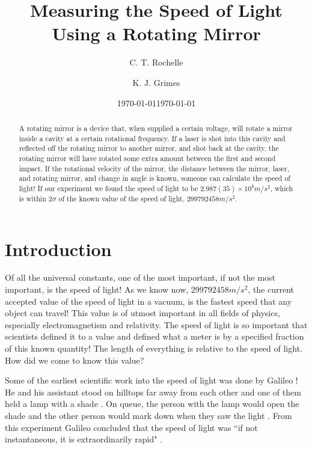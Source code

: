 \documentclass[aps,prl,10pt,twocolumn,floatfix]{revtex4-2}
\begin{document}
\begin{abstract}
A rotating mirror is a device that, when supplied a certain voltage, will rotate a mirror inside a cavity at a certain rotational frequency. 
If a laser is shot into this cavity and reflected off the rotating mirror to another mirror, and shot back at the cavity, the rotating mirror will have rotated some extra amount between the first and second impact.
If the rotational velocity of the mirror, the distance between the mirror, laser, and rotating mirror, and change in angle is known, someone can calculate the speed of light!
If our experiment we found the speed of light to be $2.987(35)\times 10^{8}m/s^2$, which is within $2\sigma$ of the known value of the speed of light, $299792458m/s^2$.
\end{abstract}


\title{Measuring the Speed of Light Using a Rotating Mirror}
\author{C. T. Rochelle}
\author{K. J. Grimes}
\date{\today}
\date{\today}

\maketitle

\section{Introduction}\label{Intro}
Of all the universal constants, one of the most important, if not the most important, is the speed of light!
As we know now, $299792458m/s^2$, the current accepted value of the speed of light in a vacuum, is the fastest speed that any object can travel!
This value is of utmost important in all fields of physics, especially electromagnetism and relativity.
The speed of light is so important that scientists defined it to a value and defined what a meter is by a specified fraction of this known quantity!
The length of everything is relative to the speed of light.
How did we come to know this value?

Some of the earliest scientific work into the speed of light was done by Galileo \cite{light}!
He and his assistant stood on hilltops far away from each other and one of them held a lamp with a shade \cite{light}.
On queue, the person with the lamp would open the shade and the other person would mark down when they saw the light \cite{light}. 
From this experiment Galileo concluded that the speed of light was ``if not instantaneous, it is extraordinarily rapid" \cite{engineer}.
\end{document}
